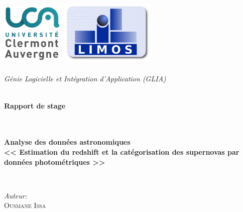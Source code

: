 \begin{titlepage}
\begin{center}

\includegraphics[width=3cm, height=3cm]{images/uca.png} \hspace{3cm}%
\includegraphics[width=0.35\textwidth]{images/limos.png}~\\[0.5cm]



\textsc{\Large }\\[0.5cm]

\textit{\Large Génie Logicielle et Intégration d'Application (GLIA)}

\textsc{\Large }\\[0.5cm]

\textbf{\Large Rapport de stage}

\textsc{\Large }\\[0.5cm]
\HRule \\[0.4cm]

{\huge \bfseries Analyse des données astronomiques \\ << Estimation du redshift et la catégorisation des supernovas par données photométriques >>\\[0.4cm] }

\HRule \\[1.5cm]

\begin{minipage}{0.4\textwidth}
\begin{flushleft} \large
\emph{Auteur:}\\
\textsc{Ousmane Issa}


\end{flushleft}
\end{minipage}
\end{center}
\end{titlepage}
